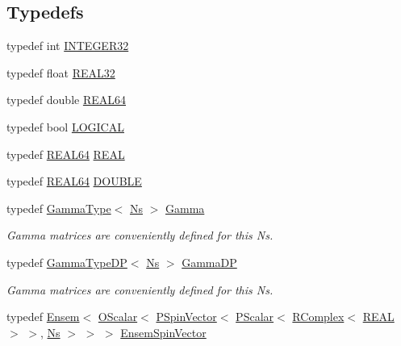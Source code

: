 \subsection*{Typedefs}
\begin{DoxyCompactItemize}
\item 
typedef int \mbox{\hyperlink{namespaceENSEM_a6a58e5c07422c48c5d547184b36719bf}{I\+N\+T\+E\+G\+E\+R32}}
\item 
typedef float \mbox{\hyperlink{namespaceENSEM_a7540d01191172323e9073283d772576d}{R\+E\+A\+L32}}
\item 
typedef double \mbox{\hyperlink{namespaceENSEM_a85b215b9f1f43715aebee01718e25082}{R\+E\+A\+L64}}
\item 
typedef bool \mbox{\hyperlink{namespaceENSEM_ade7c8d5976e979516f8c2ecd223dd0b6}{L\+O\+G\+I\+C\+AL}}
\item 
typedef \mbox{\hyperlink{namespaceENSEM_a85b215b9f1f43715aebee01718e25082}{R\+E\+A\+L64}} \mbox{\hyperlink{namespaceENSEM_a6dd9aa6508168f545c861787e63ddd1e}{R\+E\+AL}}
\item 
typedef \mbox{\hyperlink{namespaceENSEM_a85b215b9f1f43715aebee01718e25082}{R\+E\+A\+L64}} \mbox{\hyperlink{namespaceENSEM_adcbd0de4e9e0e7ef6aa9b681a554e2c5}{D\+O\+U\+B\+LE}}
\item 
typedef \mbox{\hyperlink{classENSEM_1_1GammaType}{Gamma\+Type}}$<$ \mbox{\hyperlink{namespaceENSEM_a6f05e048f9b2eb1a19131074f8abc25f}{Ns}} $>$ \mbox{\hyperlink{group__defs_ga0cf937e0a1681829b6b69762c6b8427b}{Gamma}}
\begin{DoxyCompactList}\small\item\em Gamma matrices are conveniently defined for this Ns. \end{DoxyCompactList}\item 
typedef \mbox{\hyperlink{classENSEM_1_1GammaTypeDP}{Gamma\+Type\+DP}}$<$ \mbox{\hyperlink{namespaceENSEM_a6f05e048f9b2eb1a19131074f8abc25f}{Ns}} $>$ \mbox{\hyperlink{group__defs_ga318782f1c57403a3bb07a1f4e15345c9}{Gamma\+DP}}
\begin{DoxyCompactList}\small\item\em Gamma matrices are conveniently defined for this Ns. \end{DoxyCompactList}\item 
typedef \mbox{\hyperlink{classENSEM_1_1Ensem}{Ensem}}$<$ \mbox{\hyperlink{classENSEM_1_1OScalar}{O\+Scalar}}$<$ \mbox{\hyperlink{classENSEM_1_1PSpinVector}{P\+Spin\+Vector}}$<$ \mbox{\hyperlink{classENSEM_1_1PScalar}{P\+Scalar}}$<$ \mbox{\hyperlink{classENSEM_1_1RComplex}{R\+Complex}}$<$ \mbox{\hyperlink{namespaceENSEM_a6dd9aa6508168f545c861787e63ddd1e}{R\+E\+AL}} $>$ $>$, \mbox{\hyperlink{namespaceENSEM_a6f05e048f9b2eb1a19131074f8abc25f}{Ns}} $>$ $>$ $>$ \mbox{\hyperlink{group__defs_gac817a4995f4c9a955aa536e3e9879184}{Ensem\+Spin\+Vector}}

\end{DoxyCompactItemize}
